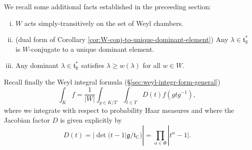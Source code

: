 \documentclass[reqno]{amsart} 
\begin{document}
We recall some additional facts established in the preceeding section:
\begin{enumerate}
[(i)]
\item $W$ acts simply-transitively on the set of Weyl chambers.
\item (dual form of Corollary \ref{cor:W-conj-to-unique-dominant-element}) Any $\lambda \in \mathfrak{t}_{\mathbb{R}}^*$ is $W$-conjugate to a unique dominant element.
\item Any dominant $\lambda \in \mathfrak{t}_{\mathbb{R}}^*$ satisfies $\lambda \geq w(\lambda)$ for all $w \in W$.
\end{enumerate}

Recall finally the Weyl integral formula (\S\ref{sec:weyl-integr-form-general})
\begin{equation}\label{eqn:WIF-recall-for-reps}
  \int_K f
  = \frac{1}{|W|}
  \int_{g \in K/T}
  \int_{t \in T}
  D(t) f (g t g^{-1}),
\end{equation}
where we integrate with respect to probability Haar measures and where the Jacobian factor $D$ is given explicitly by
\begin{equation}\label{eqn:}
  D(t) = |\det( t - 1  |
  \mathfrak{g}/\mathfrak{t}_{\mathbb{C}})|
  =
  \prod_{\alpha \in   \Phi}
  |t^{\alpha}-1|.
\end{equation}
\end{document}
